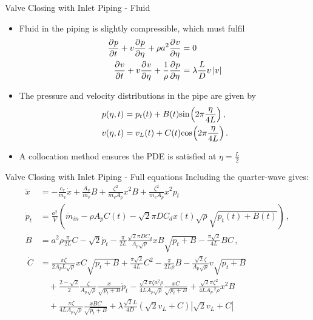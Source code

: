 \documentclass[svgnames,fragile]{beamer}
\begin{document}
\begin{frame}{Valve Closing with Inlet Piping - Fluid}
\begin{itemize}
    \item<1-> Fluid in the piping is slightly compressible, which must fulfil
    \begin{equation*}
    \begin{split}
        \pdiff{p}{t} + v \pdiff{p}{\eta} + \rho a^2 \pdiff{v}{\eta} &= 0 \\
        \pdiff{v}{t} + v \pdiff{v}{\eta} + \frac{1}{\rho} \pdiff{p}{\eta} &= \lambda \frac{L}{D} v \left| v \right|
    \end{split}
    \end{equation*}
    \item<2-> The pressure and velocity distributions in the pipe are given by
    \begin{equation*}
    \begin{split}
        p(\eta,t) &= p_t(t) + B(t) \fun{sin}{2\pi \frac{\eta}{4L}} \, ,\\
        v(\eta,t) &= v_L(t) + C(t) \fun{cos}{2\pi \frac{\eta}{4L}} \, .
    \end{split}
    \end{equation*}
    \item<3-> A collocation method ensures the PDE is satisfied at $\eta = \frac{L}{2}$
\end{itemize}
\end{frame}

\begin{frame}{Valve Closing with Inlet Piping - Full equations}
Including the quarter-wave gives:
\begin{equation*}
\begin{split}
    \ddot{x} &= - \frac{c_v}{m_v} \dot{x} + \frac{A_v}{m_v} B + \frac{\zeta^2}{m_v A_p} x^2 B + \frac{\zeta^2}{m_v A_p} x^2 p_t \\
    \dot{p}_t &= \frac{a^2}{V} \left( \dot{m}_{in} - \rho A_p C(t) - \sqrt{2} \pi D C_d x(t) \sqrt{\rho} \sqrt{p_t(t) + B(t)} \right) \, , \\
    \dot{B} &= a^2 \rho \frac{\pi}{2L} C - \sqrt{2} \dot{p}_t - \frac{\pi}{2L} \frac{\sqrt{2} \pi D C_d}{A_p \sqrt{\rho}} x B \sqrt{p_t + B} - \frac{\pi \sqrt{2}}{4L} B C \, , \\
    ~
    \dot{C} &=
    \frac{\pi \zeta}{2 A_p L \sqrt{\rho}} x C \sqrt{p_t + B}
    + \frac{\pi \sqrt{2}}{4L} C^2
    - \frac{\pi}{2 L \rho} B
    - \frac{\sqrt{2} \zeta}{A_p \sqrt{\rho}} v \sqrt{p_t + B} \\ &\quad %
    + \frac{2 - \sqrt{2}}{2} \frac{\zeta}{A_p \sqrt{\rho}} \frac{x}{\sqrt{p_t + B}} \dot{p}_t 
    - \frac{\sqrt{2}\pi\zeta a^2 \rho}{4 L A_p \sqrt{\rho}} \frac{x C}{\sqrt{p_t + B}}
    + \frac{\sqrt{2}\pi\zeta^2}{4L A_p\,^2 \rho} x^2 B \\ &\quad %
    + \frac{\pi \zeta}{4 L A_p \sqrt{\rho}} \frac{x B C}{\sqrt{p_t + B}}
    + \lambda \frac{\sqrt{2}L}{4 D} \left( \sqrt{2} v_L + C \right) \left| \sqrt{2} v_L + C \right|
\end{split}
\end{equation*}
\end{frame}
\end{document}

